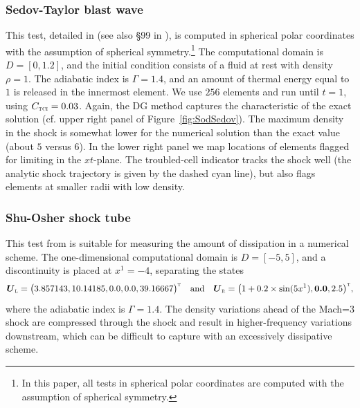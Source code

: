 \documentclass[letterpaper]{jpconf}
\newcommand{\vect}[1]{\boldsymbol{#1}}
\newcommand{\trans}{\textnormal{\tiny\textsc{T}}}
\newcommand{\leftState}{\textnormal{\tiny\textsc{L}}}
\newcommand{\rightState}{\textnormal{\tiny\textsc{R}}}
\newcommand{\TCI}{\textnormal{\tiny\textsc{TCI}}}
\begin{document}
\subsubsection{Sedov-Taylor blast wave}

This test, detailed in \cite{sedov_1959} (see also {\S}99 in \cite{landauLifshitz_1979}), is computed in spherical polar coordinates with the assumption of spherical symmetry.\footnote{In this paper, all tests in spherical polar coordinates are computed with the assumption of spherical symmetry.}
The computational domain is $D=[0,1.2]$, and the initial condition consists of a fluid at rest with density $\rho=1$.  
The adiabatic index is $\Gamma=1.4$, and an amount of thermal energy equal to $1$ is released in the innermost element.  
We use $256$ elements and run until $t=1$, using $C_{\TCI}=0.03$.  
Again, the DG method captures the characteristic of the exact solution (cf. upper right panel of Figure~\ref{fig:SodSedov}).  
The maximum density in the shock is somewhat lower for the numerical solution than the exact value (about $5$ versus $6$).  
In the lower right panel we map locations of elements flagged for limiting in the $xt$-plane.  
The troubled-cell indicator tracks the shock well (the analytic shock trajectory is given by the dashed cyan line), but also flags elements at smaller radii with low density.  

\subsubsection{Shu-Osher shock tube}

This test from \cite{shuOsher_1989} is suitable for measuring the amount of dissipation in a numerical scheme.  
The one-dimensional computational domain is $D=[-5,5]$, and a discontinuity is placed at $x^{1}=-4$, separating the states
\begin{equation*}
  \vect{U}_{\leftState}=\big( 3.857143, 10.14185, 0.0, 0.0, 39.16667 \big)^{\trans}\quad\text{and}\quad
  \vect{U}_{\rightState}=\big( 1+0.2\times\sin(5 x^{1}), \vect{0.0}, 2.5 \big)^{\trans},
\end{equation*}
where the adiabatic index is $\Gamma=1.4$.  
The density variations ahead of the Mach=3 shock are compressed through the shock and result in higher-frequency variations downstream, which can be difficult to capture with an excessively dissipative scheme.  
\end{document}
